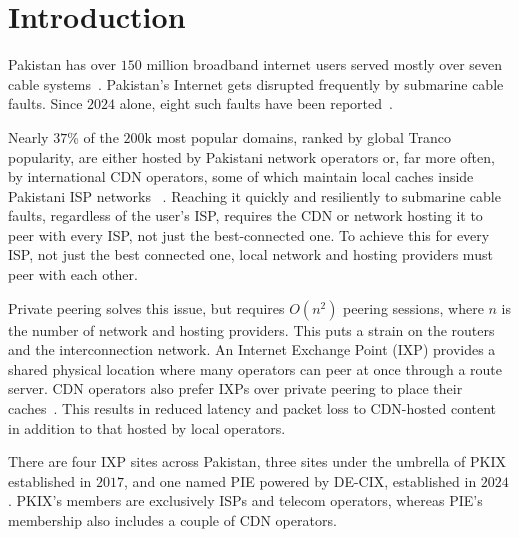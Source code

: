 \documentclass[sigconf,anonymous,10pt]{acmart}
\begin{document}

\maketitle



\section{Introduction}
Pakistan has over $150$ million broadband internet users served mostly over seven cable systems~\mbox{\cite{pta2026telecom}}. Pakistan's Internet gets disrupted frequently by submarine cable faults. Since $2024$ alone, eight such faults have been reported~\cite{subtelforum2024pakistan, tribune2025aae1, aljazeera2025redsea, arabnews2025maintenance, pta2026smw5}.


Nearly $37$\% of the $200\text{k}$ most popular domains, ranked by global Tranco popularity, are either hosted by Pakistani network operators or, far more often, by international CDN operators, some of which maintain local caches inside Pakistani ISP networks ~\cite{tranco}. Reaching it quickly and resiliently to submarine cable faults, regardless of the user's ISP, requires the CDN or network hosting it to peer with every ISP, not just the best-connected one.
To achieve this for every ISP, not just the best connected one, local network and hosting providers must peer with each other.

Private peering solves this issue, but requires $O(n^2)$ peering sessions, where $n$ is the number of network and hosting providers. This puts a strain on the routers and the interconnection network. An Internet Exchange Point (IXP) provides a shared physical location where many operators can peer at once through a route server. CDN operators also prefer IXPs over private peering to place their caches~\cite{opalinski2024quest}. This results in reduced latency and packet loss to CDN-hosted content in addition to that hosted by local operators. 

There are four IXP sites across Pakistan, three sites under the umbrella of PKIX established in $2017$, and one named PIE powered by DE-CIX, established in $2024$. PKIX's members are exclusively ISPs and telecom operators, whereas PIE's membership also includes a couple of CDN operators.
\end{document}
